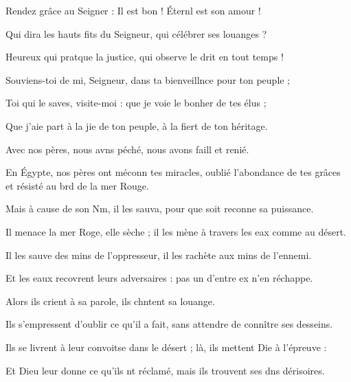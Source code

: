 \item Rendez grâce au Seigner : Il est bon !\psstar{} Éternl est son amour !
\item Qui dira les hauts fits du Seigneur,\psstar{} qui célébrer ses louanges ?
\item Heureux qui pratque la justice,\psstar{} qui observe le drit en tout temps !
\item Souviens-toi de mi, Seigneur,\psstar{} dans ta bienveillnce pour ton peuple ; 
\item Toi qui le saves, visite-moi :\psstar{} que je voie le bonher de tes élus ;
\item Que j’aie part à la jie de ton peuple,\psstar{} à la fiert de ton héritage.
\item Avec nos pères, nous avns péché,\psstar{} nous avons faill et renié.
\item En Égypte, nos pères ont méconn tes miracles,\psstar{} oublié l’abondance de tes grâces et résisté au brd de la mer Rouge.
\item Mais à cause de son Nm, il les sauva,\psstar{} pour que soit reconne sa puissance.
\item Il menace la mer Roge, elle sèche ;\psstar{} il les mène à travers les eax comme au désert.
\item Il les sauve des mins de l’oppresseur,\psstar{} il les rachète aux mins de l’ennemi.
\item Et les eaux recovrent leurs adversaires :\psstar{} pas un d’entre ex n’en réchappe.
\item Alors ils crient à sa parole,\psstar{} ils chntent sa louange.
\item Ils s’empressent d’oublir ce qu’il a fait,\psstar{} sans attendre de connître ses desseins.
\item Ils se livrent à leur convoitse dans le désert ;\psstar{} là, ils mettent Die à l’épreuve :
\item Et Dieu leur donne ce qu’ils nt réclamé,\psstar{} mais ils trouvent ses dns dérisoires.